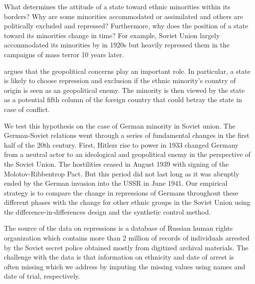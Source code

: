 What determines the attitude of a state toward ethnic minorities within
its borders? Why are some minorities accommodated or assimilated and
others are politically excluded and repressed? Furthermore,  why does the
position of a state toward its minorities change in time? For example,
Soviet Union largely accommodated its minorities by in 1920s but 
heavily repressed them in the campaigns of  mass terror 10 years later. 

\citet{mylonas_politics_2013} argues that the geopolitical concerns play an important role. In particular, a state is likely to choose repression and
exclusion if the ethnic minority's country of origin is seen as an
geopolitical enemy. The minority is then viewed by the state as a potential fifth column of the foreign country that could betray the state in case of conflict.   

We test this hypothesis on the case of German minority in Soviet union.
The German-Soviet relations went through a series of fundamental changes in  the first half of the 20th century. 
First, Hitlers rise to power in 1933 changed Germany from a neutral actor to an ideological and geopolitical enemy in the perspective of the Soviet Union. The hostilities ceased in August 1939 with signing of the Molotov-Ribbentrop Pact. But this period did not last long as it was abruptly ended by the German invasion into the USSR in June 1941. 
Our empirical strategy is to compare the change in repressions of Germans throughout these different phases  with the change for other ethnic groups in the Soviet Union using the difference-in-differences design and the synthetic control method. 

The source of the data on repressions is a database of  Russian human rights organization \citet{memorial_zhertvy_2017} which contains more than 2 million of records of individuals arrested by the Soviet secret police obtained mostly from digitized archival materials. 
The challenge with the data is that information on ethnicity and date of arrest is often missing which we address by imputing the missing values using names and date of trial, respectively. 


